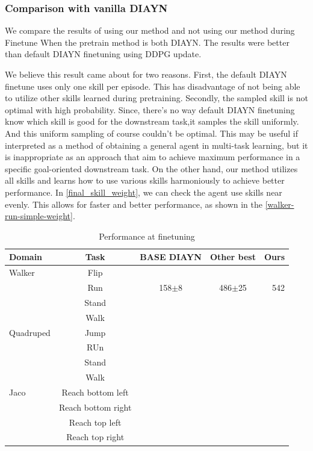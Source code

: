 \subsubsection{Comparison with vanilla DIAYN}
We compare the results of using our method and not using our method during Finetune When the pretrain method is both DIAYN.
The results were better than default DIAYN finetuning using DDPG update.

We believe this result came about for two reasons.
First, the default DIAYN finetune uses only one skill per episode.
This has disadvantage of not being able to utilize other skills learned during pretraining.
Secondly, the sampled skill is not optimal with high probability.
Since, there's no way default DIAYN finetuning know which skill is good for the downstream task,it samples the skill uniformly.
And this uniform sampling of course couldn't be optimal.
This may be useful if interpreted as a method of obtaining a general agent in multi-task learning,
but it is inappropriate as an approach that aim to achieve maximum performance in a specific goal-oriented downstream task.
On the other hand, our method utilizes all skills and learns how to use various skills harmoniously to achieve better performance.
In \cref*{final_skill_weight}, we can check the agent use skills near evenly.
This allows for faster and better performance, as shown in the \cref{walker-run-simple-weight}.

\begin{table}[t]
  \caption{Performance at finetuning}
  \label{finetuning result}
  \vskip 0.15in
  \begin{center}
  \begin{small}
  \begin{sc}
  \begin{tabular}{lcccr}
  \toprule
  Domain & Task & BASE DIAYN & Other best & Ours \\
  \midrule
  Walker & Flip    &  \\
   & Run    & 158$\pm$8 & 486$\pm$25 & 542\\
   & Stand    &  \\
   & Walk    &  \\
  Quadruped & Jump    &  \\
   & RUn    &  \\
   & Stand    &  \\
   & Walk   &  \\
  Jaco & Reach bottom left    &  \\
   & Reach bottom right   &  \\
   & Reach top left    & \\
   & Reach top right   &  \\
  
  
  
  \bottomrule
  \end{tabular}
  \end{sc}
  \end{small}
  \end{center}
  \vskip -0.1in
  \end{table}

